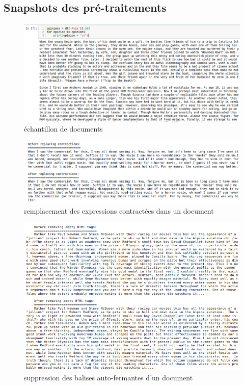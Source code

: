\documentclass[12pt,a4paper]{report}
\theoremstyle{definition}
\begin{document}
\begin{appendices}
\chapter{Snapshots des pré-traitements}
\begin{figure}[!ht]
  \centering
  \includegraphics[scale=0.4]{images/snapshots/preprocessing/documents_sample.png}
  \caption{échantillon de documents}
  \label{fig:document_sample}
\end{figure}

\begin{figure}[!ht]
  \centering
  \includegraphics[scale=0.4]{images/snapshots/preprocessing/replace_contractions.png}
  \caption{remplacement des expressions contractées dans un document}
  \label{fig:replace_contractions}
\end{figure}

\begin{figure}[!ht]
  \centering
  \includegraphics[scale=0.6]{images/snapshots/preprocessing/remove_empty_html_tags.png}
  \caption{suppression des balises auto-fermantes d'un document}
  \label{fig:remove_empty_html_tags}
\end{figure}


\end{appendices}
\end{document}
